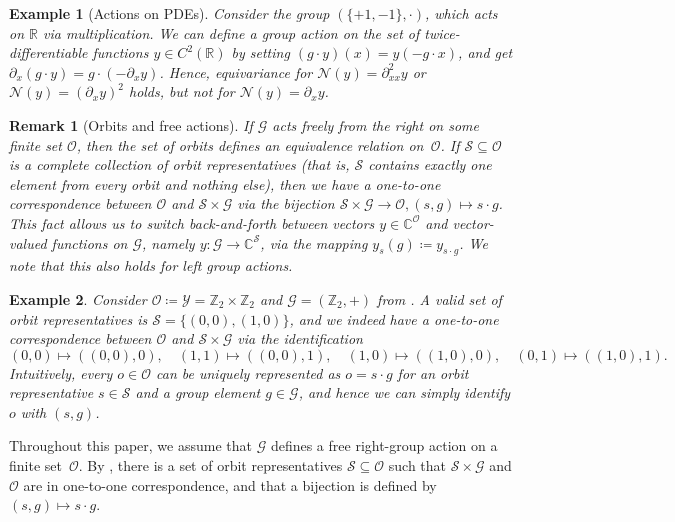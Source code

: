 \documentclass[preprint,12pt,authoryear]{elsarticle}
\newcommand{\Z}{\mathbb Z}
\newcommand{\R}{\mathbb{R}}
\newcommand{\C}{\mathbb{C}}
\newcommand{\Ncal}{\mathcal{N}}
\newcommand\Gc{\mathcal G}
\newcommand\Oc{\mathcal O}
\newcommand\Yc{\mathcal Y}
\newcommand\Sc{\mathcal S}
\newtheorem{remark}{Remark}%
\newtheorem{example}{Example}[section]%
\begin{document}
{\begin{example}[Actions on PDEs]
    Consider the group $(\{+1,-1\}, \cdot)$, which acts on $\R$ via multiplication. We can define a group action on the set of twice-differentiable functions  $y \in C^2(\R)$ by setting $(g \cdot y)(x) = y(- g \cdot x)$, and get $\partial_x (g \cdot y) = g \cdot (-\partial_x y)$. Hence, equivariance for $\Ncal(y) = \partial_{xx}^2 y$ or $\Ncal(y) = (\partial_x y)^2$ holds, but not for $\Ncal(y) = \partial_x y$.
\end{example}


\begin{remark}[Orbits and free actions]\label{rem:orbits-and-free-actions}
    If $\Gc$ acts freely from the right on some finite set $\Oc$, then the set of orbits defines an equivalence relation on~$\Oc$. %
    If $\Sc \subseteq \Oc$ is a complete collection of orbit representatives (that is, $\Sc$ contains exactly one element from every orbit and nothing else), then we have a one-to-one correspondence between $\Oc$ and $\Sc \times \Gc$ via the bijection $\Sc \times \Gc \rightarrow \Oc, (s, g) \mapsto s \cdot g$. This fact allows us to switch back-and-forth between vectors $y \in \C^\Oc$ and vector-valued functions on $\Gc$, namely $y : \Gc \rightarrow \C^\Sc$, via the mapping $y_s(g) \coloneqq y_{s \cdot g}$. We note that this also holds for left group actions. %
\end{remark}

\begin{example}
    Consider $\Oc \coloneqq \Yc = \Z_2 \times \Z_2$ and $\Gc = (\Z_2,+)$ from . A valid set of orbit representatives is $\Sc = \{ (0,0), (1,0) \}$, and we indeed have a one-to-one correspondence between $\Oc$ and $\Sc \times \Gc$ via the identification
    $$
        (0,0) \mapsto ((0,0), 0), \quad (1,1) \mapsto ((0,0), 1),
        \quad (1,0) \mapsto ((1,0), 0), \quad (0,1) \mapsto ((1,0), 1).
    $$
    Intuitively, every $o \in \Oc$ can be uniquely represented as $o = s \cdot g$ for an orbit representative $s \in \Sc$ and a group element $g \in \Gc$, and hence we can simply identify $o$ with $(s, g)$.
\end{example}

Throughout this paper, we assume that $\Gc$ defines a free right-group action on a finite set~$\Oc$. By , there is a set of orbit representatives $\Sc \subseteq \Oc$ such that $\Sc \times \Gc$ and $\Oc$ are in one-to-one correspondence, and that a bijection is defined by $(s,g) \mapsto s \cdot g$.

}
\end{document}
